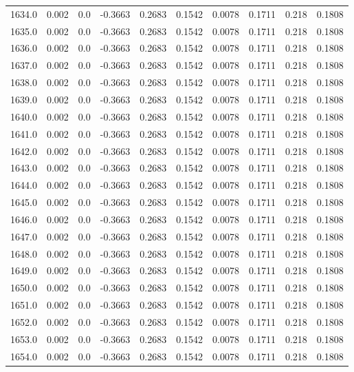 \begin{longtable}{lrrrrrrrrr}
1634.0 & 0.002 & 0.0 & -0.3663 & 0.2683 & 0.1542 & 0.0078 & 0.1711 & 0.218 & 0.1808 \\
1635.0 & 0.002 & 0.0 & -0.3663 & 0.2683 & 0.1542 & 0.0078 & 0.1711 & 0.218 & 0.1808 \\
1636.0 & 0.002 & 0.0 & -0.3663 & 0.2683 & 0.1542 & 0.0078 & 0.1711 & 0.218 & 0.1808 \\
1637.0 & 0.002 & 0.0 & -0.3663 & 0.2683 & 0.1542 & 0.0078 & 0.1711 & 0.218 & 0.1808 \\
1638.0 & 0.002 & 0.0 & -0.3663 & 0.2683 & 0.1542 & 0.0078 & 0.1711 & 0.218 & 0.1808 \\
1639.0 & 0.002 & 0.0 & -0.3663 & 0.2683 & 0.1542 & 0.0078 & 0.1711 & 0.218 & 0.1808 \\
1640.0 & 0.002 & 0.0 & -0.3663 & 0.2683 & 0.1542 & 0.0078 & 0.1711 & 0.218 & 0.1808 \\
1641.0 & 0.002 & 0.0 & -0.3663 & 0.2683 & 0.1542 & 0.0078 & 0.1711 & 0.218 & 0.1808 \\
1642.0 & 0.002 & 0.0 & -0.3663 & 0.2683 & 0.1542 & 0.0078 & 0.1711 & 0.218 & 0.1808 \\
1643.0 & 0.002 & 0.0 & -0.3663 & 0.2683 & 0.1542 & 0.0078 & 0.1711 & 0.218 & 0.1808 \\
1644.0 & 0.002 & 0.0 & -0.3663 & 0.2683 & 0.1542 & 0.0078 & 0.1711 & 0.218 & 0.1808 \\
1645.0 & 0.002 & 0.0 & -0.3663 & 0.2683 & 0.1542 & 0.0078 & 0.1711 & 0.218 & 0.1808 \\
1646.0 & 0.002 & 0.0 & -0.3663 & 0.2683 & 0.1542 & 0.0078 & 0.1711 & 0.218 & 0.1808 \\
1647.0 & 0.002 & 0.0 & -0.3663 & 0.2683 & 0.1542 & 0.0078 & 0.1711 & 0.218 & 0.1808 \\
1648.0 & 0.002 & 0.0 & -0.3663 & 0.2683 & 0.1542 & 0.0078 & 0.1711 & 0.218 & 0.1808 \\
1649.0 & 0.002 & 0.0 & -0.3663 & 0.2683 & 0.1542 & 0.0078 & 0.1711 & 0.218 & 0.1808 \\
1650.0 & 0.002 & 0.0 & -0.3663 & 0.2683 & 0.1542 & 0.0078 & 0.1711 & 0.218 & 0.1808 \\
1651.0 & 0.002 & 0.0 & -0.3663 & 0.2683 & 0.1542 & 0.0078 & 0.1711 & 0.218 & 0.1808 \\
1652.0 & 0.002 & 0.0 & -0.3663 & 0.2683 & 0.1542 & 0.0078 & 0.1711 & 0.218 & 0.1808 \\
1653.0 & 0.002 & 0.0 & -0.3663 & 0.2683 & 0.1542 & 0.0078 & 0.1711 & 0.218 & 0.1808 \\
1654.0 & 0.002 & 0.0 & -0.3663 & 0.2683 & 0.1542 & 0.0078 & 0.1711 & 0.218 & 0.1808 \\

\end{longtable}
